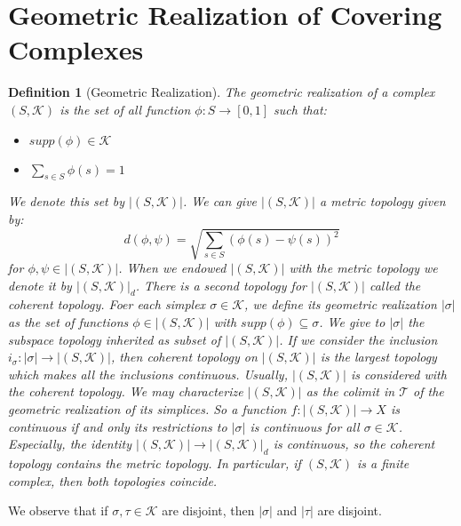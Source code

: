 \documentclass{amsart}
\newtheorem{definition}{Definition}[section]
\begin{document}
\section{Geometric Realization of Covering Complexes}

\begin{definition}[Geometric Realization]
The geometric realization of a complex $(S,\mathcal{K})$ is the set of all function $\phi\colon S\longrightarrow [0,1]$ such that:
\begin{itemize}
\item $supp(\phi)\in\mathcal{K}$
\item $\sum_{s\in S}\phi(s)=1$
\end{itemize}
We denote this set by $\vert (S,\mathcal{K})\vert$. We can give $\vert (S,\mathcal{K})\vert$ a metric topology given by:
\[
d(\phi,\psi)=\sqrt{\sum_{s\in S}(\phi(s)-\psi(s))^{2}}
\]
for $\phi,\psi\in \vert (S,\mathcal{K})\vert$. When we endowed $\vert (S,\mathcal{K})\vert$ with the metric topology we denote it by $\vert (S,\mathcal{K})\vert_d$. There is a second topology for $\vert (S,\mathcal{K})\vert$ called the coherent topology. Foer each simplex $\sigma\in\mathcal{K}$, we define its geometric realization $\vert\sigma\vert$ as the set of functions $\phi\in \vert (S,\mathcal{K})\vert$ with $supp(\phi)\subseteq \sigma$. We give to $\vert \sigma\vert$ the subspace topology inherited as subset of $\vert (S,\mathcal{K})\vert$. If we consider the inclusion $i_\sigma\colon\vert\sigma\vert\longrightarrow \vert (S,\mathcal{K})\vert$, then coherent topology on $\vert (S,\mathcal{K})\vert$ is the largest topology which makes all the inclusions continuous. Usually, $\vert (S,\mathcal{K})\vert$ is considered with the coherent topology. We may characterize $\vert (S,\mathcal{K})\vert$ as the colimit  in $\mathcal{T}$ of the geometric realization of its simplices. So a function $f\colon\vert (S,\mathcal{K})\vert\longrightarrow X$ is continuous if and only its restrictions to $\vert\sigma\vert$ is continuous for all $\sigma\in\mathcal{K}$. Especially, the identity $\vert (S,\mathcal{K})\vert\longrightarrow \vert (S,\mathcal{K})\vert_d$ is continuous, so the coherent topology contains the metric topology. In particular, if $(S,\mathcal{K})$ is a finite complex, then both topologies coincide.
\end{definition}

We observe that if $\sigma, \tau\in\mathcal{K}$ are disjoint, then $\vert\sigma\vert$ and $\vert\tau\vert$ are disjoint.
\end{document}
